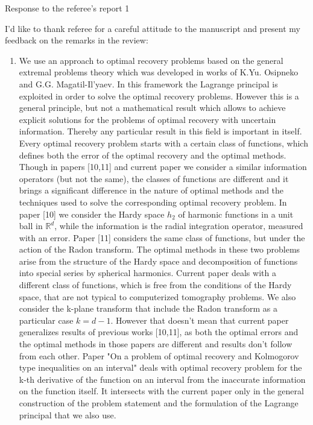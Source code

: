 \documentclass{article}
\begin{document}
\begin{center}
{\Large Response to the referee's report 1}
\end{center}
\vspace{5mm}

I'd like to thank referee for a careful attitude to the manuscript and present my feedback on the remarks in the review:

\begin{enumerate}
    \item We use an approach to optimal recovery problems based on the general extremal problems theory which was developed in works of K.Yu. Osipneko and G.G. Magatil-Il'yaev. In this framework the Lagrange principal is exploited in order to solve the optimal recovery problems. However this is a general principle, but not a mathematical result which allows to achieve explicit solutions for the problems of optimal recovery with uncertain information. Thereby any particular result in this field is important in itself. Every optimal recovery problem starts with a certain class of functions, which defines both the error of the optimal recovery and the optimal methods. Though in papers [10,11] and current paper we consider a similar information operators (but not the same), the classes of functions are different and it brings a significant difference in the nature of optimal methods and the techniques used to solve the corresponding optimal recovery problem. In paper [10] we consider the Hardy space $h_2$ of harmonic functions in a unit ball in $\mathbb R^d$, while the information is the radial integration operator, measured with an error. Paper [11] considers the same class of functions, but under the action of the Radon transform. The optimal methods in these two problems arise from the structure of the Hardy space and decomposition of functions into special series by spherical harmonics. Current paper deals with a different class of functions, which is free from the conditions of the Hardy space, that are not typical to computerized tomography problems. We also consider the k-plane transform that include the Radon transform as a particular case $k=d-1$. However that doesn't mean that current paper generalizes results of previous works [10,11], as both the optimal errors and the optimal methods in those papers are different and results don't follow from each other. Paper "On a problem of optimal recovery and Kolmogorov type inequalities on an interval" deals with optimal recovery problem for the k-th derivative of the function on an interval from the inaccurate information on the function itself. It intersects with the current paper only in the general construction of the problem statement and the formulation of the Lagrange principal that we also use.
    

\end{enumerate}
\end{document}
